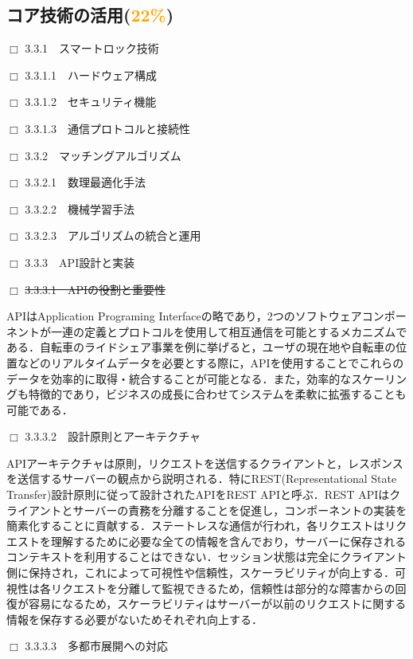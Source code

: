   \subsection{コア技術の活用(\textcolor{orange}{22\%})}
    \label{sec:コア技術の活用}
      \par $\Box$ 3.3.1　スマートロック技術
      \par $\Box$ 3.3.1.1　ハードウェア構成
      \par $\Box$ 3.3.1.2　セキュリティ機能
      \par $\Box$ 3.3.1.3　通信プロトコルと接続性
      \par $\Box$ 3.3.2　マッチングアルゴリズム
      \par $\Box$ 3.3.2.1　数理最適化手法
      \par $\Box$ 3.3.2.2　機械学習手法
      \par $\Box$ 3.3.2.3　アルゴリズムの統合と運用
      \par $\Box$ 3.3.3　API設計と実装
      \par $\Box$ \sout{3.3.3.1　APIの役割と重要性}
      \par APIはApplication Programing Interfaceの略であり，2つのソフトウェアコンポーネントが一連の定義とプロトコルを使用して相互通信を可能とするメカニズムである．自転車のライドシェア事業を例に挙げると，ユーザの現在地や自転車の位置などのリアルタイムデータを必要とする際に，APIを使用することでこれらのデータを効率的に取得・統合することが可能となる．また，効率的なスケーリングも特徴的であり，ビジネスの成長に合わせてシステムを柔軟に拡張することも可能である．
      \par $\Box$ 3.3.3.2　設計原則とアーキテクチャ
      \par APIアーキテクチャは原則，リクエストを送信するクライアントと，レスポンスを送信するサーバーの観点から説明される．特にREST(Representational State Transfer)設計原則に従って設計されたAPIをREST APIと呼ぶ．REST APIはクライアントとサーバーの責務を分離することを促進し，コンポーネントの実装を簡素化することに貢献する．ステートレスな通信が行われ，各リクエストはリクエストを理解するために必要な全ての情報を含んでおり，サーバーに保存されるコンテキストを利用することはできない．セッション状態は完全にクライアント側に保持され，これによって可視性や信頼性，スケーラビリティが向上する．可視性は各リクエストを分離して監視できるため，信頼性は部分的な障害からの回復が容易になるため，スケーラビリティはサーバーが以前のリクエストに関する情報を保存する必要がないためそれぞれ向上する．
      \par $\Box$ 3.3.3.3　多都市展開への対応
      
